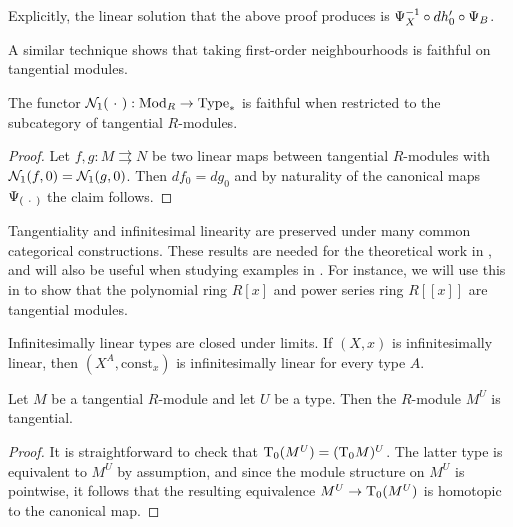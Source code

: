 \begin{remark}
  Explicitly, the linear solution that the above proof produces is $\can_X^{-1} \circ \der{h'}{0} \circ \can_B$.
\end{remark}

A similar technique shows that taking first-order neighbourhoods is
faithful on tangential modules.

\begin{proposition}\label{prop:hood-faithful}
  The functor $\hood{\argmhole}{1} : \modcat R \rightarrow \pType$ is faithful when restricted to the subcategory of tangential $R$-modules.
\end{proposition}

\begin{proof}
  Let $f,g : M \rightrightarrows N$ be two linear maps between tangential $R$-modules with $\hood{f,0}{1} = \hood{g,0}{1}$.
  Then $df_0=dg_0$ and by naturality of the canonical maps $\can_{(\argmhole)}$ the claim follows.
\end{proof}

Tangentiality and infinitesimal linearity are preserved under many common categorical constructions.
These results are needed for the theoretical work in , and
will also be useful when studying examples in .
For instance, we will use this in  to show that the polynomial ring $R[x]$ and power series ring $R[[x]]$ are tangential modules.

\begin{proposition}\label{prp:lim-inf-lin}
  Infinitesimally linear types are closed under limits.
  If $(X,x)$ is infinitesimally linear, then $(X^A, \mathrm{const}_x)$ is infinitesimally linear for every type $A$.
  \earlyqed
\end{proposition}

\begin{proposition}\label{prp:exp-tangential}
  Let $M$ be a tangential $R$-module and let $U$ be a type.
  Then the $R$-module $M^U$ is tangential.
\end{proposition}

\begin{proof}
  It is straightforward to check that $\tangent{(M^U)}{0} = (\tangent{M}{0})^U$.
  The latter type is equivalent to $M^U$ by assumption,
  and since the module structure on $M^U$ is pointwise, it follows that the
  resulting equivalence $M^U \to \tangent{(M^U)}{0}$ is homotopic to the canonical map.
\end{proof}

